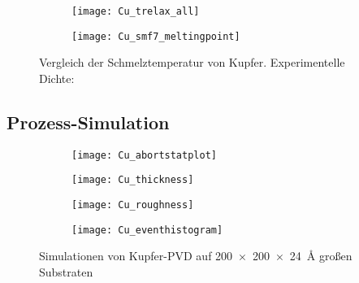 \begin{figure}
  \captionsetup[subfigure]{singlelinecheck=false}
  \def\subfigwidth{7cm}
  \begin{subfigure}[t]{\subfigwidth}
    \texttt{[image: Cu\_trelax\_all]}
  \end{subfigure}
  \hfill
  \begin{subfigure}[t]{\subfigwidth}
    \texttt{[image: Cu\_smf7\_meltingpoint]}
  \end{subfigure}
  \caption[Vergleich der Schmelztemperatur von Kupfer]{
    Vergleich der Schmelztemperatur von Kupfer.
    Experimentelle Dichte: \cite{brillo_density_2006}
  }
  \label{fig:copperthermo}
\end{figure}

\subsection{Prozess-Simulation}
\label{coppersimulation}

\begin{figure}
  \captionsetup[subfigure]{singlelinecheck=false}
  \def\subfigwidth{0.49\textwidth}
  \begin{subfigure}[t]{\subfigwidth}
    \texttt{[image: Cu\_abortstatplot]}
    \label{fig:copperparsivald-a}
  \end{subfigure}
  \hfill
  \begin{subfigure}[t]{\subfigwidth}
    \texttt{[image: Cu\_thickness]}
    \label{fig:copperparsivald-b}
  \end{subfigure}
  \begin{subfigure}[t]{\subfigwidth}
    \texttt{[image: Cu\_roughness]}
    \label{fig:copperparsivald-c}
  \end{subfigure}
  \hfill
  \begin{subfigure}[t]{\subfigwidth}
    \texttt{[image: Cu\_eventhistogram]}
    \label{fig:copperparsivald-d}
  \end{subfigure}
  \caption{Simulationen von Kupfer-PVD auf \SI{200x200x24}{\angstrom} großen Substraten}
  \label{fig:copperparsivald}
\end{figure}

